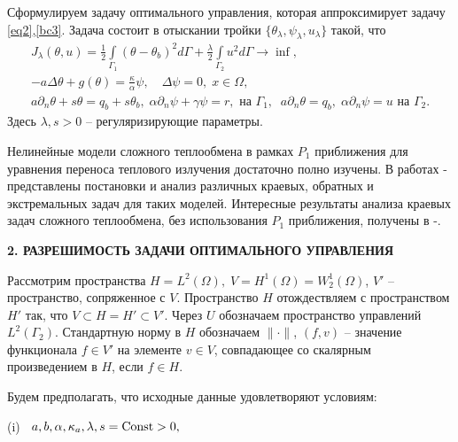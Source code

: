 \documentclass[12pt]{article}
\begin{document}
 Сформулируем задачу оптимального управления, которая аппроксимирует задачу 
\eqref{eq2},\eqref{bc3}. Задача состоит в отыскании тройки $\{\theta_\lambda,\psi_\lambda,u_\lambda\}$ такой, что
    \begin{equation}\label{cost}
       \begin{split}
        J_\lambda(\theta, u) = \frac{1}{2}\int\limits_{\Gamma_1} (\theta - \theta_b)^2d\Gamma + \frac{\lambda}{2}\int\limits_{\Gamma_2} u^2d\Gamma \rightarrow\inf, \\
    - a \Delta \theta + g (\theta) = \frac{\kappa}{\alpha}\psi, \quad
    \Delta \psi = 0, \; x \in \Omega,\\
        a \partial_n \theta + s \theta = q_b + s\theta_b, \; \alpha \partial_n \psi + \gamma \psi = r, \text{ на } \Gamma_1,\;\; a \partial_n \theta  = q_b,\; 
        \alpha \partial_n \psi = u \text{ на } \Gamma_2.
\end{split}   
    \end{equation}
   Здесь $\lambda, s > 0$ -- регуляризирующие параметры. 
   
    
Нелинейные модели сложного теплообмена в рамках $P_1$ приближения для уравнения переноса теплового излучения достаточно полно изучены.  
В работах
\cite{Pinnau07}-\cite{JVM-19-INV} представлены постановки и анализ различных краевых, обратных и экстремальных задач 
для таких моделей. Интересные результаты анализа краевых задач сложного теплообмена, без использования $P_1$ приближения, получены в
\cite{Amosov16}-\cite{Amosov20-1}.





    \begin{center}
        \textbf{2. РАЗРЕШИМОСТЬ ЗАДАЧИ ОПТИМАЛЬНОГО УПРАВЛЕНИЯ}
    \end{center}

    Рассмотрим пространства $H = L^2(\Omega), \; V = H^1(\Omega)=W^1_2(\Omega)$, $V'$ -- пространство, сопряженное с $V$.
    Пространство $H$ отождествляем с пространством $H'$ так, что $V \subset H = H' \subset V'$. Через $U$ обозначаем пространство управлений $L^2(\Gamma_2)$.
Стандартную норму в $H$ обозначаем $\|\cdot\|$,
    $(f,v)$ -- значение функционала $f\in V'$ на элементе $v\in V$,
    совпадающее со скалярным произведением в $H$, если $f\in H$.
    

    Будем предполагать, что исходные данные удовлетворяют условиям:

    (i) $\;\; a,b,\alpha,\kappa_a, \lambda, s ={\rm Const}> 0 ,$
\end{document}

